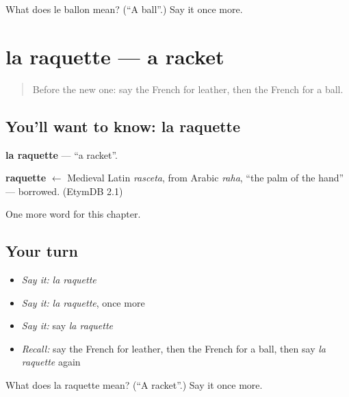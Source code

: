 \begin{tcolorbox}[breakable,colback=teal!4,colframe=teal!35!black,title={Before you move on}]
What does le ballon mean? (\textquotedblleft{}A ball\textquotedblright{}.) Say it once more.
\end{tcolorbox}
\section[la raquette]{la raquette — a racket}

\label{lesson:FR-C173-raquette}



\begin{quote}
Before the new one: say the French for leather, then the French for a ball.
\end{quote}

\subsection*{You'll want to know: la raquette}
\textbf{la raquette} — \textquotedblleft{}a racket\textquotedblright{}.

\begin{cousinweb}
\textbf{raquette} $\leftarrow$ Medieval Latin \emph{rasceta}, from Arabic \emph{raha}, \textquotedblleft{}the palm of the hand\textquotedblright{} — borrowed. (EtymDB 2.1)
\end{cousinweb}

\begin{grammarlens}[title={What you've built}]
One more word for this chapter.
\end{grammarlens}

\subsection*{Your turn}
\begin{itemize}
\raggedright
  \item \emph{Say it:} \emph{la raquette}
  \item \emph{Say it:} \emph{la raquette}, once more
  \item \emph{Say it:} say \emph{la raquette}
  \item \emph{Recall:} say the French for leather, then the French for a ball, then say \emph{la raquette} again
\end{itemize}

\begin{tcolorbox}[breakable,colback=teal!4,colframe=teal!35!black,title={Before you move on}]
What does la raquette mean? (\textquotedblleft{}A racket\textquotedblright{}.) Say it once more.
\end{tcolorbox}
